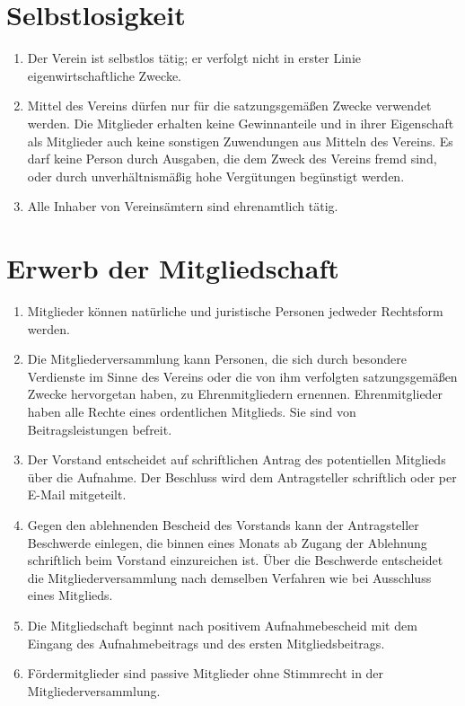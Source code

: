 \documentclass[a4paper, 12pt]{scrartcl}
\begin{document}
\section{Selbstlosigkeit}
\begin{enumerate}
	\item Der Verein ist selbstlos tätig; er verfolgt nicht in erster Linie eigenwirtschaftliche Zwecke.
	\item Mittel des Vereins dürfen nur für die satzungsgemäßen Zwecke verwendet werden. Die Mitglieder erhalten keine Gewinnanteile und in ihrer Eigenschaft als Mitglieder auch keine sonstigen Zuwendungen aus Mitteln des Vereins. Es darf keine Person durch Ausgaben, die dem Zweck des Vereins fremd sind, oder durch unverhältnismäßig hohe Vergütungen begünstigt werden.
	\item Alle Inhaber von Vereinsämtern sind ehrenamtlich tätig.
\end{enumerate}

\section{Erwerb der Mitgliedschaft}
\begin{enumerate}
	\item Mitglieder können natürliche und juristische Personen jedweder Rechtsform werden.
	\item Die Mitgliederversammlung kann Personen, die sich durch besondere Verdienste im Sinne des Vereins oder die von ihm verfolgten satzungsgemäßen Zwecke hervorgetan haben, zu Ehrenmitgliedern ernennen. Ehrenmitglieder haben alle Rechte eines ordentlichen Mitglieds. Sie sind von Beitragsleistungen befreit.
	\item Der Vorstand entscheidet auf schriftlichen Antrag des potentiellen  Mitglieds über die Aufnahme. Der Beschluss wird dem Antragsteller schriftlich 
oder per E-Mail mitgeteilt.
	\item Gegen den ablehnenden Bescheid des Vorstands kann der Antragsteller Beschwerde einlegen, die binnen eines Monats ab Zugang der Ablehnung schriftlich beim Vorstand einzureichen ist. Über die Beschwerde entscheidet die Mitgliederversammlung nach demselben Verfahren wie bei Ausschluss eines Mitglieds.
	\item Die Mitgliedschaft beginnt nach positivem Aufnahmebescheid mit dem Eingang des Aufnahmebeitrags und des ersten Mitgliedsbeitrags.
	\item Fördermitglieder sind passive Mitglieder ohne Stimmrecht in der Mitgliederversammlung.
\end{enumerate}
\end{document}
